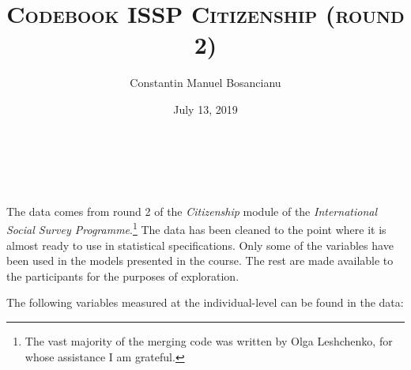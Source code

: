 \documentclass[12pt,english]{article}
\title{\textsc{Codebook ISSP Citizenship (round 2)}}
\author{Constantin Manuel Bosancianu}
\affil{WZB Berlin Social Science Center \\ \textit{Institutions and Political Inequality}}
\date{July 13, 2019}
\makeatletter
\renewcommand{\maketitle}{
  \begin{flushleft}
    {\huge\@title}\\
    \vspace{10pt}
    {\large\@author}\\
    {\@date}
    \vspace{40pt}
  \end{flushleft}
}
\makeatother
\begin{document}
\maketitle

The data comes from round 2 of the \textit{Citizenship} module of the \textit{International Social Survey Programme}.\footnote{The vast majority of the merging code was written by Olga Leshchenko, for whose assistance I am grateful.} The data has been cleaned to the point where it is almost ready to use in statistical specifications. Only some of the variables have been used in the models presented in the course. The rest are made available to the participants for the purposes of exploration.

The following variables measured at the individual-level can be found in the data:
\end{document}
